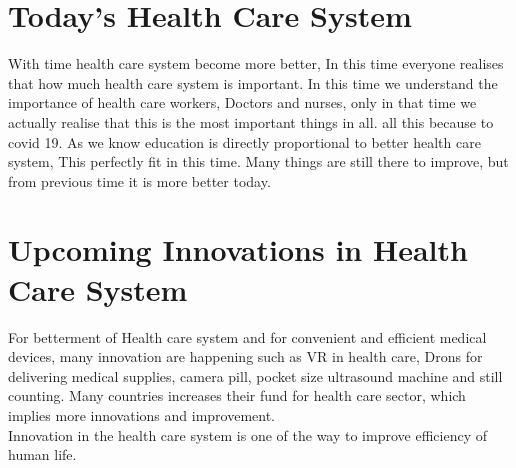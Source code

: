 \documentclass[12pt]{article}
\begin{document}
 \section{Today's Health Care System}
 
 With time health care system become more better, In this time everyone realises that how much health care system is important. In this time we understand the importance of health care workers, Doctors and nurses, only in that time we actually realise that this is the most important things in all. all this because to covid 19. As we know education is  directly proportional to better health care system, This perfectly fit in this time. Many things are still there to improve, but from previous time it  is more better today.
 
 
 \section{Upcoming Innovations in Health Care System}
 
 For betterment of Health care system and for convenient and efficient medical devices, many innovation are happening such as VR in health care, Drons for delivering  medical supplies, camera pill, pocket size ultrasound machine and still counting. Many countries increases their fund for health care sector, which implies more innovations and improvement. \\
 Innovation in the health care system is one of the way to improve efficiency of human life. 
 
 
 
 
 
 
\end{document}
